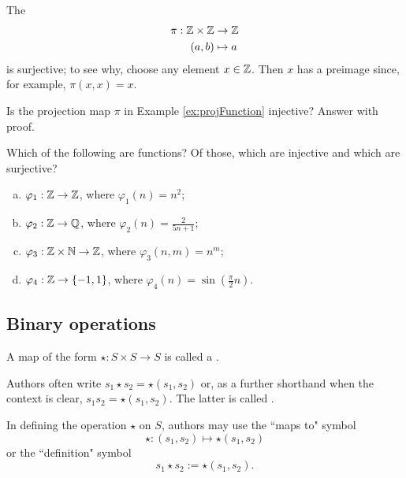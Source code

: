 \documentclass[../UNABRIDGEDalgebraNotesMSRI-UP2016.tex]{subfiles}
\begin{document}
\begin{frame}%
\begin{ex}\label{ex:projFunction}
The  
\begin{align*}
\pi: \mathbb Z\times \mathbb Z &\to \mathbb Z \\
 (a,b) &\mapsto a
\end{align*} 
is surjective; to see why, choose any element $x\in\mathbb Z$.  Then $x$ has a preimage since, for example, $\pi(x,x)=x$.    
\end{ex}

\smallGap
\begin{que}
Is the projection map $\pi$ in Example \ref{ex:projFunction} injective?  Answer with proof.
\end{que}
\end{frame}

\begin{frame}[c]
\begin{exe}[cf. Problem 38]\label{exe:functions}
Which of the following are functions?  Of those, which are injective and which are surjective?
\begin{enumerate}[(a)]
\item $\varphi_1:\mathbb Z\to \mathbb Z$, where $\varphi_1(n)=n^2$;
\item $\varphi_2:\mathbb Z\to \mathbb Q$, where $\varphi_2(n)=\frac{2}{5n+1}$;
\item $\varphi_3:\mathbb Z\times \mathbb N\to \mathbb Z$, where $\varphi_3(n,m)=n^m$;
\item $\varphi_4:\mathbb Z\to\{-1,1\}$, where $\varphi_4(n)=\sin(\frac{\pi}{2}n)$.
\end{enumerate}
\end{exe}
\end{frame}

\subsection[\subsecname]{Binary operations}
\begin{frame}{\subsecname}
\begin{dfn}
A map of the form $\star:S\times S\to S$ is called a .
\end{dfn}

\smallGap
Authors often write $s_1\star s_2=\star(s_1,s_2)$ or, as a further shorthand when the context is clear, $s_1s_2=\star(s_1,s_2)$.  The latter is called .  

\smallGap
In defining the operation $\star$ on $S$, authors may use the ``maps to" symbol  
\[
\star:(s_1,s_2)\mapsto \star{(s_1,s_2)}
\]
or the ``definition" symbol
\[
s_1\star s_2:= \star{(s_1,s_2)}.
\]
\end{frame}
\end{document}
